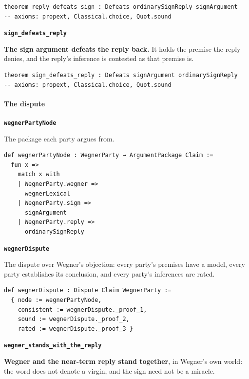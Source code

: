 \documentclass[11pt]{article}
\begin{document}
{\small\begin{verbatim}
theorem reply_defeats_sign : Defeats ordinarySignReply signArgument
-- axioms: propext, Classical.choice, Quot.sound
\end{verbatim}}
\par\medskip\noindent\textbf{\texttt{sign\_\allowbreak{}defeats\_\allowbreak{}reply}}\par\nobreak\noindent
\textbf{The sign argument defeats the reply back.} It holds the premise the reply denies, and the reply's inference is contested as that premise is.

{\small\begin{verbatim}
theorem sign_defeats_reply : Defeats signArgument ordinarySignReply
-- axioms: propext, Classical.choice, Quot.sound
\end{verbatim}}
\paragraph*{The dispute}
\leavevmode\par
\par\medskip\noindent\textbf{\texttt{wegner\allowbreak{}Party\allowbreak{}Node}}\par\nobreak\noindent
The package each party argues from.

{\small\begin{verbatim}
def wegnerPartyNode : WegnerParty → ArgumentPackage Claim :=
  fun x =>
    match x with
    | WegnerParty.wegner =>
      wegnerLexical
    | WegnerParty.sign =>
      signArgument
    | WegnerParty.reply =>
      ordinarySignReply
\end{verbatim}}
\par\medskip\noindent\textbf{\texttt{wegner\allowbreak{}Dispute}}\par\nobreak\noindent
The dispute over Wegner's objection: every party's premises have a model, every party establishes its conclusion, and every party's inferences are rated.

{\small\begin{verbatim}
def wegnerDispute : Dispute Claim WegnerParty :=
  { node := wegnerPartyNode,
    consistent := wegnerDispute._proof_1,
    sound := wegnerDispute._proof_2,
    rated := wegnerDispute._proof_3 }
\end{verbatim}}
\par\medskip\noindent\textbf{\texttt{wegner\_\allowbreak{}stands\_\allowbreak{}with\_\allowbreak{}the\_\allowbreak{}reply}}\par\nobreak\noindent
\textbf{Wegner and the near-term reply stand together}, in Wegner's own world: the word does not denote a virgin, and the sign need not be a miracle.
\end{document}
